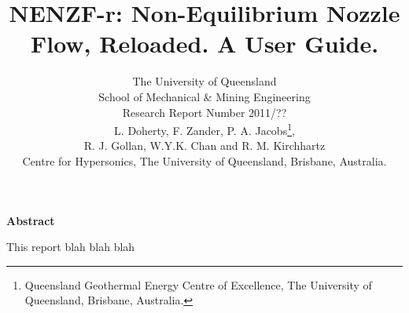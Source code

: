 \documentclass[12pt,a4paper]{article}
\title{
    NENZF-r: Non-Equilibrium Nozzle\\
    Flow, Reloaded. A User Guide.
}
\author{
    The University of Queensland \\
    School of Mechanical \& Mining Engineering \\
    Research Report Number 2011/?? 
    \vspace{0.5cm} \\
    L. Doherty,
    F. Zander, 
    P. A. Jacobs\thanks{Queensland Geothermal Energy Centre of 
     Excellence, The University of Queensland, Brisbane, Australia.},\\
    R. J. Gollan, 
    W.Y.K. Chan and 
    R. M. Kirchhartz\\
    {Centre for Hypersonics, The University of 
     Queensland, Brisbane, Australia.}
\\
}
\begin{document}
\maketitle

\centerline{\textbf{Abstract}}
\medskip
This report blah blah blah
\newpage
\tableofcontents










\newpage

%


\newpage
\appendix

%
\end{document}
